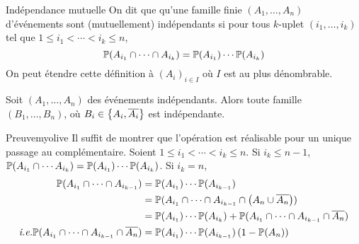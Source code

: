    \begin{defi}{Indépendance mutuelle}{}
        On dit que qu’une famille finie $(A_1, \ldots, A_n)$ d’événements sont (mutuellement) indépendants si pour tous $k$-uplet $(i_1,\ldots,i_k)$ tel que $1 \leq i_1 < \cdots < i_k \leq n$, 
            \[ \P(A_{i_1} \cap \cdots \cap A_{i_k}) = \P(A_{i_1}) \cdots \P(A_{i_k}) \]  
        On peut étendre cette définition à $(A_i)_{i \in I}$ où $I$ est au plus dénombrable.
    \end{defi}

    \begin{prop}{}{}
        Soit $(A_1, \ldots, A_n)$ des événements indépendants. Alors toute famille $(B_1, \ldots, B_n)$, où $B_i \in \left\{A_i, \ovl{A_i}\right\}$ est indépendante.
    \end{prop}

    \begin{demo}{Preuve}{myolive}   
        Il suffit de montrer que l’opération est réalisable pour un unique passage au complémentaire. Soient $1 \leq i_1 < \cdots < i_k \leq n$. Si $i_k \leq n-1$, $\P(A_{i_1} \cap \cdots A_{i_k}) = \P(A_{i_1}) \cdots \P(A_{i_k})$. Si $i_k = n$, 
        \begin{align*}
            \P(A_{i_1} \cap \cdots \cap A_{i_{k-1}}) &= \P(A_{i_1}) \cdots \P(A_{i_{k-1}}) \\
            &= \P(A_{i_1} \cap \cdots \cap A_{i_{k-1}} \cap \left(A_n \cup \ovl{A_n}\right)) \\
            &= \P(A_{i_1}) \cdots \P(A_{i_k}) + \P(A_{i_1} \cap \cdots \cap A_{i_{k-1}} \cap \ovl{A_n}) \\
            \textit{i.e.} \P(A_{i_1} \cap \cdots \cap A_{i_{k-1}} \cap \ovl{A_n}) &= \P(A_{i_1}) \cdots \P(A_{i_{k-1}}) \left(1 - \P(A_n)\right)
        \end{align*}
    \end{demo}

